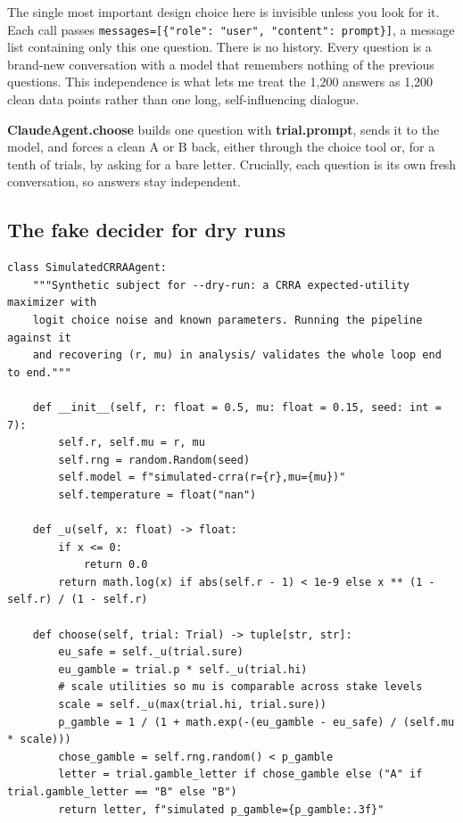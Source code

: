 \documentclass[11pt]{article}
\newcommand{\file}[1]{\textbf{\ttfamily #1}}
\begin{document}
The single most important design choice here is invisible unless you look for it. Each call passes
\verb|messages=[{"role": "user", "content": prompt}]|, a message list containing only this one
question. There is no history. Every question is a brand-new conversation with a model that remembers
nothing of the previous questions. This independence is what lets me treat the 1{,}200 answers as
1{,}200 clean data points rather than one long, self-influencing dialogue.

\begin{plainbox}
\file{ClaudeAgent.choose} builds one question with \file{trial.prompt}, sends it to the model, and
forces a clean A or B back, either through the choice tool or, for a tenth of trials, by asking for a
bare letter. Crucially, each question is its own fresh conversation, so answers stay independent.
\end{plainbox}

\subsection{The fake decider for dry runs}

\begin{lstlisting}[style=py,firstnumber=108]
class SimulatedCRRAAgent:
    """Synthetic subject for --dry-run: a CRRA expected-utility maximizer with
    logit choice noise and known parameters. Running the pipeline against it
    and recovering (r, mu) in analysis/ validates the whole loop end to end."""

    def __init__(self, r: float = 0.5, mu: float = 0.15, seed: int = 7):
        self.r, self.mu = r, mu
        self.rng = random.Random(seed)
        self.model = f"simulated-crra(r={r},mu={mu})"
        self.temperature = float("nan")

    def _u(self, x: float) -> float:
        if x <= 0:
            return 0.0
        return math.log(x) if abs(self.r - 1) < 1e-9 else x ** (1 - self.r) / (1 - self.r)

    def choose(self, trial: Trial) -> tuple[str, str]:
        eu_safe = self._u(trial.sure)
        eu_gamble = trial.p * self._u(trial.hi)
        # scale utilities so mu is comparable across stake levels
        scale = self._u(max(trial.hi, trial.sure))
        p_gamble = 1 / (1 + math.exp(-(eu_gamble - eu_safe) / (self.mu * scale)))
        chose_gamble = self.rng.random() < p_gamble
        letter = trial.gamble_letter if chose_gamble else ("A" if trial.gamble_letter == "B" else "B")
        return letter, f"simulated p_gamble={p_gamble:.3f}"
\end{lstlisting}
\end{document}
